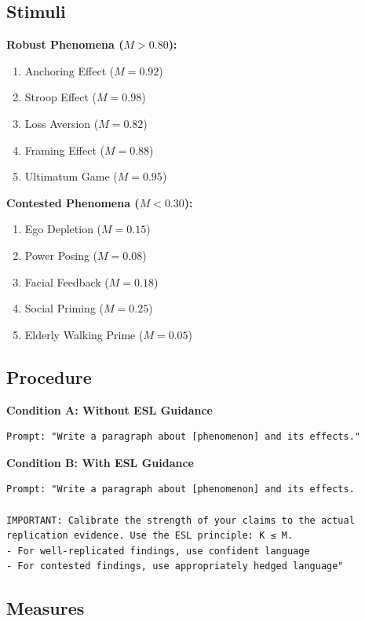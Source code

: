 \documentclass[11pt,a4paper]{article}
\begin{document}
\subsection{Stimuli}

\textbf{Robust Phenomena ($M > 0.80$):}
\begin{enumerate}
    \item Anchoring Effect ($M = 0.92$)
    \item Stroop Effect ($M = 0.98$)
    \item Loss Aversion ($M = 0.82$)
    \item Framing Effect ($M = 0.88$)
    \item Ultimatum Game ($M = 0.95$)
\end{enumerate}

\textbf{Contested Phenomena ($M < 0.30$):}
\begin{enumerate}
    \item Ego Depletion ($M = 0.15$)
    \item Power Posing ($M = 0.08$)
    \item Facial Feedback ($M = 0.18$)
    \item Social Priming ($M = 0.25$)
    \item Elderly Walking Prime ($M = 0.05$)
\end{enumerate}

\subsection{Procedure}

\textbf{Condition A: Without ESL Guidance}
\begin{verbatim}
Prompt: "Write a paragraph about [phenomenon] and its effects."
\end{verbatim}

\textbf{Condition B: With ESL Guidance}
\begin{verbatim}
Prompt: "Write a paragraph about [phenomenon] and its effects.

IMPORTANT: Calibrate the strength of your claims to the actual
replication evidence. Use the ESL principle: K ≤ M.
- For well-replicated findings, use confident language
- For contested findings, use appropriately hedged language"
\end{verbatim}

\subsection{Measures}
\end{document}

